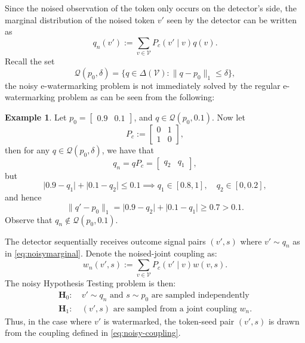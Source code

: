 \documentclass[12pt]{article}
\theoremstyle{plain}
\theoremstyle{definition}
\newtheorem{example}[theorem]{Example}
\begin{document}
Since the noised observation of the token only occurs on the detector's side, the marginal distribution of the noised token $v'$ seen by the detector can be written as 
\begin{equation}\label{eq:noisymarginal}q_n(v') := \sum_{v \in \mathcal{V}}P_c(v'\mid v)q(v).\end{equation}
Recall the set
\begin{equation}\label{eq:l1ball}\mathcal{Q}(p_0,\delta) = \{q \in \Delta(\mathcal{V}) : \lVert q - p_0\rVert_1 \le \delta \},\end{equation}
the noisy e-watermarking problem is not immediately solved by the regular e-watermarking problem as can be seen from the following:

\begin{example}
Let $p_0 = \begin{bmatrix}
     0.9 & 0.1
\end{bmatrix}$, and $q \in \mathcal{Q}(p_0,0.1)$. Now let 
\[P_c := \begin{bmatrix}
    0 & 1 \\
    1 & 0
\end{bmatrix},\]
then for any $q \in \mathcal{Q}(p_0,\delta)$, we have that 
$$q_n = qP_c = \begin{bmatrix}
    q_2 & q_1
\end{bmatrix},$$
but 
$$\lvert 0.9 - q_1\rvert + \lvert 0.1 - q_2\rvert \le 0.1 \implies q_1 \in [0.8,1], \quad q_2 \in [0,0.2],$$
and hence
$$\lVert q'-p_0\rVert_1 = \lvert 0.9 - q_2 \rvert + \lvert 0.1 - q_1\rvert \ge 0.7 > 0.1.$$
Observe that $q_n \not \in \mathcal{Q}(p_0,0.1)$.


\end{example}



The detector sequentially receives outcome signal pairs $(v',s)$ where $v' \sim q_n$ as in \eqref{eq:noisymarginal}. Denote the noised-joint coupling as:
\begin{equation}\label{eq:noisy-coupling}w_n(v',s) := \sum_{v \in \mathcal{V}}P_c(v'\mid v) w(v,s).\end{equation}
The noisy Hypothesis Testing problem is then:
\begin{align*}
    \textbf{H}_0: &~ v' \sim q_n \text{ and } s \sim p_0 \text{ are sampled independently} \\
    \textbf{H}_1: &~ (v',s) \text{ are sampled from a joint coupling }w_n.
\end{align*}
Thus, in the case where $v'$ is watermarked, the token-seed pair $(v',s)$ is drawn from the coupling defined in \eqref{eq:noisy-coupling}.
\end{document}
